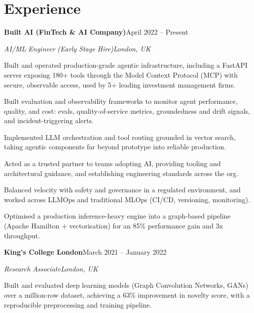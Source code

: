 \documentclass[10pt,a4paper]{article}
\newcommand{\entry}[4]{%
  {\color{company}\bfseries #1}\hfill {\color{muted}#2}\par
  \vspace{1pt}
  {\itshape #3}\hfill {\color{muted}\itshape #4}\par
  \vspace{3pt}%
}
\begin{document}
\section{Experience}
\entry{Built AI (FinTech \& AI Company)}{April 2022 -- Present}{AI/ML Engineer (Early Stage Hire)}{London, UK}
\begin{tight}
  \item Built and operated production-grade agentic infrastructure, including a FastAPI server exposing 180+ tools through the Model Context Protocol (MCP) with secure, observable access, used by 5+ leading investment management firms.
  \item Built evaluation and observability frameworks to monitor agent performance, quality, and cost: evals, quality-of-service metrics, groundedness and drift signals, and incident-triggering alerts.
  \item Implemented LLM orchestration and tool routing grounded in vector search, taking agentic components far beyond prototype into reliable production.
  \item Acted as a trusted partner to teams adopting AI, providing tooling and architectural guidance, and establishing engineering standards across the org.
  \item Balanced velocity with safety and governance in a regulated environment, and worked across LLMOps and traditional MLOps (CI/CD, versioning, monitoring).
  \item Optimised a production inference-heavy engine into a graph-based pipeline (Apache Hamilton + vectorisation) for an 85\% performance gain and 3x throughput.
\end{tight}

\entry{King's College London}{March 2021 -- January 2022}{Research Associate}{London, UK}
\begin{tight}
  \item Built and evaluated deep learning models (Graph Convolution Networks, GANs) over a million-row dataset, achieving a 63\% improvement in novelty score, with a reproducible preprocessing and training pipeline.
\end{tight}

\end{document}
